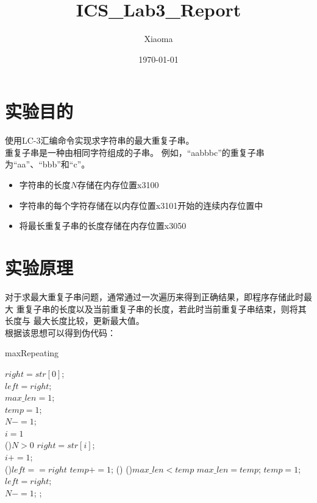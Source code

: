\documentclass[12pt, a4paper, oneside]{ctexart}
\title{ICS\_Lab3\_Report}
\author{Xiaoma}
\date{\today}
\begin{document}
\maketitle
\section*{实验目的}
使用LC-3汇编命令实现求字符串的最大重复子串。\\
重复子串是一种由相同字符组成的子串。
例如，“aabbbc”的重复子串为“aa”、“bbb”和“c”。
\begin{itemize}
    \item 字符串的长度$N$存储在内存位置x3100
    \item 字符串的每个字符存储在以内存位置x3101开始的连续内存位置中
    \item 将最长重复子串的长度存储在内存位置x3050

\end{itemize}

\section*{实验原理}
对于求最大重复子串问题，通常通过一次遍历来得到正确结果，即程序存储此时最大
重复子串的长度以及当前重复子串的长度，若此时当前重复子串结束，则将其长度与
最大长度比较，更新最大值。\\
根据该思想可以得到伪代码：

\begin{algorithm*}
    \caption{maxRepeating}
    \label{alg:algorithm}
    \BlankLine
    $right = str[0]$;\\
    $left = right$;\\
    $max\_len = 1$;\\
    $temp = 1$;\\
    $N -= 1$;\\
    $i = 1$\\
    \While(){$N > 0$}{
        $right = str[i]$;\\
        $i += 1$;\\
        \If(){$left == right$}{
            $temp += 1$;
        }
        \Else(){
            \If(){$max\_len < temp$}{
                $max\_len = temp$;
            }
            $temp = 1$;
        }
        $left = right$;\\
        $N -= 1$;
    }
    ;
\end{algorithm*}
\end{document}
